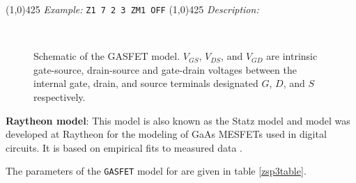 \linethickness{0.5mm} \line(1,0){425}
\newline
\textit{Example:}
\newline
\texttt{Z1 7 2 3 ZM1 OFF}
\newline
\linethickness{0.5mm} \line(1,0){425}
\newline
\textit{Description:}\\
%
%
\label{ZGASFETmodel}
\label{GASFETmodelsp3}
\begin{figure}[h]
\centering \ \epsfxsize=2.75in \caption[Schematic
of the \spicethree\ GASFET model]{Schematic of the \spicethree
GASFET model. \label{zspice3gasfet} $V_{GS}$, $V_{DS}$, and
$V_{GD}$ are intrinsic gate-source, drain-source and gate-drain
voltages between the internal gate, drain, and source terminals
designated $G$, $D$, and $S$ respectively.  }
\end{figure}



{\bf Raytheon model}:
\newline
This model is also known as the Statz model and model was
developed at Raytheon for the modeling of GaAs MESFETs used in
digital circuits.  It is based on empirical fits to measured data
\cite{statz:87}.

The parameters of the {\tt GASFET} model for \pspice are given in
table \ref{zsp3table}.

